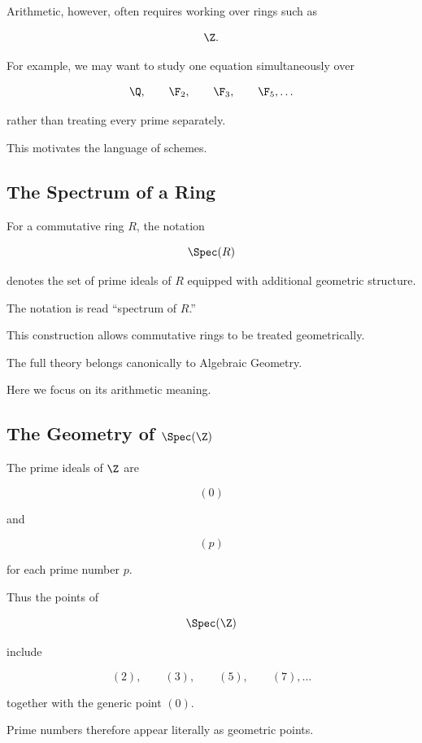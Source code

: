 Arithmetic, however, often requires working over rings such as

\[ \Z. \]

For example, we may want to study one equation simultaneously over

\[
\Q,\qquad
\F_2,\qquad
\F_3,\qquad
\F_5,\ldots
\]

rather than treating every prime separately.

This motivates the language of schemes.

\subsection{The Spectrum of a Ring}
\label{subsec:spectrum-ring-arithmetic}

For a commutative ring \(R\), the notation

\[ \Spec(R) \]

denotes the set of prime ideals of \(R\) equipped with additional geometric
structure.

The notation is read ``spectrum of \(R\).''

This construction allows commutative rings to be treated geometrically.

The full theory belongs canonically to Algebraic Geometry.

Here we focus on its arithmetic meaning.

\subsection{The Geometry of \(\Spec(\Z)\)}
\label{subsec:geometry-spec-z}

The prime ideals of \(\Z\) are

\[ (0) \]

and

\[ (p) \]

for each prime number \(p\).

Thus the points of

\[ \Spec(\Z) \]

include

\[
(2),\qquad
(3),\qquad
(5),\qquad
(7),\ldots
\]

together with the generic point \((0)\).

Prime numbers therefore appear literally as geometric points.

